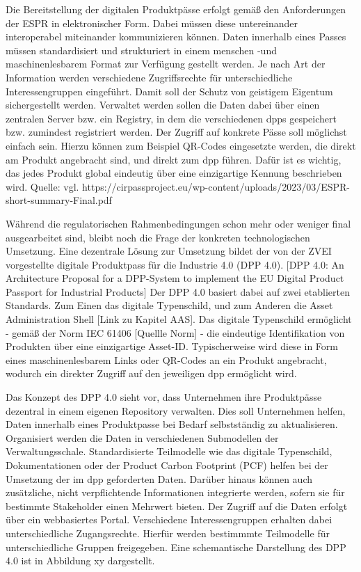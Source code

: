 Die Bereitstellung der digitalen Produktpässe erfolgt gemäß den Anforderungen der ESPR in elektronischer Form. Dabei müssen diese untereinander interoperabel miteinander kommunizieren können.
Daten innerhalb eines Passes müssen standardisiert und strukturiert in einem menschen -und maschinenlesbarem Format zur Verfügung gestellt werden.
Je nach Art der Information werden verschiedene Zugriffsrechte für unterschiedliche Interessengruppen eingeführt. Damit soll der Schutz von geistigem Eigentum sichergestellt werden.
Verwaltet werden sollen die Daten dabei über einen zentralen Server bzw. ein Registry, in dem die verschiedenen \acsp{dpp} gespeichert bzw. zumindest registriert werden.
Der Zugriff auf konkrete Pässe soll möglichst einfach sein. Hierzu können zum Beispiel QR-Codes eingesetzte werden, die direkt am Produkt angebracht sind, und direkt zum \acs{dpp} führen.
Dafür ist es wichtig, das jedes Produkt global eindeutig über eine einzigartige Kennung beschrieben wird.
Quelle: vgl. https://cirpassproject.eu/wp-content/uploads/2023/03/ESPR-short-summary-Final.pdf

Während die regulatorischen Rahmenbedingungen schon mehr oder weniger final ausgearbeitet sind, bleibt noch die Frage der konkreten technologischen Umsetzung.
Eine dezentrale Lösung zur Umsetzung bildet der von der ZVEI vorgestellte digitale Produktpass für die Industrie 4.0 (DPP 4.0). [DPP 4.0: An Architecture Proposal for a DPP-System to implement the EU Digital Product Passport for Industrial Products]
Der DPP 4.0 basiert dabei auf zwei etablierten Standards. Zum Einen das digitale Typenschild, und zum Anderen die Asset Administration Shell [Link zu Kapitel AAS].
Das digitale Typenschild ermöglicht - gemäß der Norm IEC 61406 [Quellle Norm] - die eindeutige Identifikation von Produkten über eine einzigartige Asset-ID.
Typischerweise wird diese in Form eines maschinenlesbarem Links oder QR-Codes an ein Produkt angebracht, wodurch ein direkter Zugriff auf den jeweiligen \acs{dpp} ermöglicht wird.

Das Konzept des DPP 4.0 sieht vor, dass Unternehmen ihre Produktpässe dezentral in einem eigenen Repository verwalten.
Dies soll Unternehmen helfen, Daten innerhalb eines Produktpasse bei Bedarf selbstständig zu aktualisieren.
Organisiert werden die Daten in verschiedenen Submodellen der Verwaltungsschale. 
Standardisierte Teilmodelle wie das digitale Typenschild, Dokumentationen oder der Product Carbon Footprint (PCF) helfen bei der Umsetzung der im \acs{dpp} geforderten Daten.
Darüber hinaus können auch zusätzliche, nicht verpflichtende Informationen integrierte werden, sofern sie für bestimmte Stakeholder einen Mehrwert bieten.
Der Zugriff auf die Daten erfolgt über ein webbasiertes Portal. Verschiedene Interessengruppen erhalten dabei unterschiedliche Zugangsrechte. 
Hierfür werden bestimmmte Teilmodelle für unterschiedliche Gruppen freigegeben.
Eine schemantische Darstellung des DPP 4.0 ist in Abbildung xy dargestellt.

